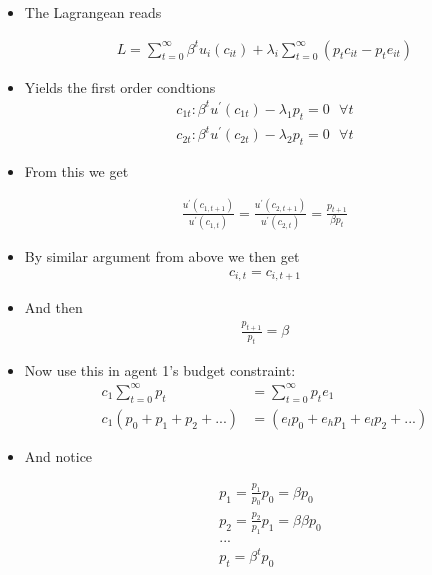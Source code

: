 \documentclass{scrartcl}
\begin{document}
\begin{itemize}
	\item The Lagrangean reads
	
		\begin{align}
	L=\sum_{t=0}^{\infty}  \beta^t u_{i} (c_{it})+ \lambda_{i} \sum_{t=0}^{\infty} \left( p_t c_{it}-p_t e_{it}\right)
	\end{align}
	
	\item Yields the first order condtions
	\begin{align}
	c_{1t}: \beta^t u^{\prime}(c_{1t})-\lambda_1 p_t=0  \text{ } \forall t\\
	c_{2t}: \beta^t u^{\prime}(c_{2t})-\lambda_2 p_t=0 \text{ } \forall t
	\end{align}
	
	\item From this we get
	
	\begin{align}
	\frac{u^{\prime}(c_{1,t+1})}{u^{\prime}(c_{1,t})}=\frac{u^{\prime}(c_{2,t+1})}{u^{\prime}(c_{2,t})}=\frac{p_{t+1}}{\beta p_{t}}
	\end{align}
	
	\item By similar argument from above we then get
	\begin{align}
	c_{i,t}=c_{i,t+1}
	\end{align}
	\item And then
	\begin{align}
	\frac{p_{t+1}}{p_{t}}=\beta
	\end{align}
	
	\item Now use this in agent 1's budget constraint:
	\begin{align}
	c_1 \sum_{t=0}^{\infty}  p_t &= \sum_{t=0}^{\infty}  p_t e_{1}  \\
	c_1 \left( p_0+ p_1 + p_2 + ... \right) &= \left( e_l p_0+ e_h p_1 + e_l p_2 + ... \right)
	\end{align}
	
	\item And notice

	\begin{align}
	&p_1 = \frac{p_1}{p_0} p_0 = \beta p_0 \\
	&p_2 = \frac{p_2}{p_1} p_1 = \beta \beta p_0 \\
	&... \\
	&p_t =  \beta^t p_0
	\end{align}
	

\end{itemize}
\end{document}
